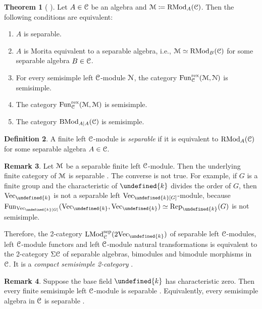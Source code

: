 \documentclass[10pt]{article}
\let\mathbb\undefined
\theoremstyle{definition}
\newtheorem{thm}{Theorem}[section]
\newtheorem{defn}[thm]{Definition}
\newtheorem{rem}[thm]{Remark}
\numberwithin{equation}{section}
\numberwithin{thm}{section}
\newcommand{\bnu}{\begin{enumerate}}
\newcommand{\enu}{\end{enumerate}}
\newcommand{\bk}{\mathbb{k}}
\newcommand{\CC}{\EuScript{C}}
\newcommand{\CM}{\EuScript{M}}
\newcommand{\CN}{\EuScript{N}}
\DeclareMathOperator{\fun}{Fun}
\DeclareMathOperator{\LMod}{LMod}
\DeclareMathOperator{\RMod}{RMod}
\DeclareMathOperator{\BMod}{BMod}
\newcommand{\vect}{\mathrm{Vec}}
\newcommand{\rep}{\mathrm{Rep}}
\newcommand{\rex}{\mathrm{rex}}
\newcommand{\sep}{\mathrm{sep}}
\begin{document}
\begin{thm}[\textnormal{\cite[Theorem 3.5.4]{DSPS20} \cite[Proposition 4.6]{KZ17}}] \label{thm_separable_module}
Let $A \in \CC$ be an algebra and $\CM \coloneqq \RMod_A(\CC)$. Then the following conditions are equivalent:
\bnu[(1)]
\item $A$ is separable.
\item $A$ is Morita equivalent to a separable algebra, i.e., $\CM \simeq \RMod_B(\CC)$ for some separable algebra $B \in \CC$.
\item For every semisimple left $\CC$-module $\CN$, the category $\fun_\CC^\rex(\CM,\CN)$ is semisimple.
\item The category $\fun_\CC^\rex(\CM,\CM)$ is semisimple.
\item The category $\BMod_{A|A}(\CC)$ is semisimple.
\enu
\end{thm}

\begin{defn}
A finite left $\CC$-module is \emph{separable} if it is equivalent to $\RMod_A(\CC)$ for some separable algebra $A \in \CC$.
\end{defn}

\begin{rem} \label{rem_separable_module_separable_category}
Let $\CM$ be a separable finite left $\CC$-module. Then the underlying finite category of $\CM$ is separable \cite[Corollary 4.5]{KZ17}. The converse is not true. For example, if $G$ is a finite group and the characteristic of $\bk$ divides the order of $G$, then $\vect_\bk$ is not a separable left $\vect_\bk[G]$-module, because $\fun_{\vect_\bk[G]}(\vect_\bk,\vect_\bk) \simeq \rep_\bk(G)$ is not semisimple.
\end{rem}

Therefore, the 2-category $\LMod_\CC^\sep(2\vect_\bk)$ of separable left $\CC$-modules, left $\CC$-module functors and left $\CC$-module natural transformations is equivalent to the 2-category $\Sigma \CC$ of separable algebras, bimodules and bimodule morphisms in $\CC$. It is a \emph{compact semisimple 2-category} \cite[Theorem 1.3.4]{Dec23}.

\begin{rem} \label{rem_char_0_separable_semisimple}
Suppose the base field $\bk$ has characteristic zero. Then every finite semisimple left $\CC$-module is separable \cite[Corollary 3.6.9]{DSPS20}. Equivalently, every semisimple algebra in $\CC$ is separable \cite[Theorem 6.10]{KZ17}.
\end{rem}
\end{document}
